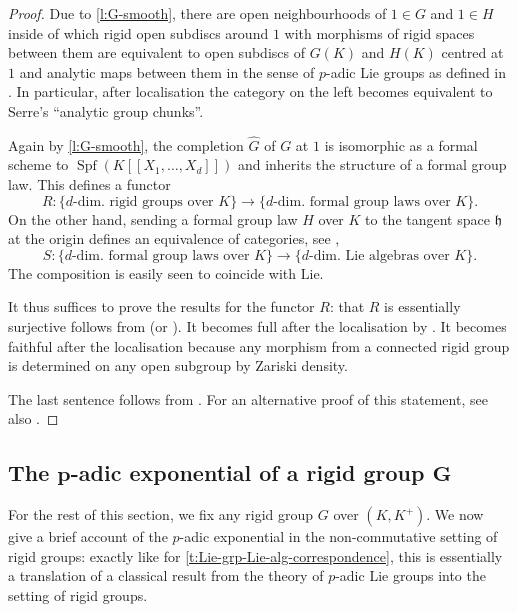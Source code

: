 \documentclass[10pt,a4paper]{article}
\theoremstyle{definition}
\theoremstyle{remark}
\newcommand{\lra}{\longrightarrow}
\newcommand{\wh}{\widehat}
\newcommand{\Spf}{\operatorname{Spf}}
\numberwithin{equation}{section}
\begin{document}
\begin{proof}
	Due to \cref{l:G-smooth}, there are open neighbourhoods of $1\in G$ and $1\in H$ inside of which rigid open subdiscs around $1$ with morphisms of rigid spaces between them are equivalent to open subdiscs of $G(K)$ and $H(K)$ centred at $1$ and analytic maps between them in the sense of $p$-adic Lie groups as defined in \cite[Part~II, Chapter~II]{Serre_Lie}. In particular, after localisation the category on the left becomes  equivalent to Serre's ``analytic group chunks''.
	
	Again by \cref{l:G-smooth}, the completion $\wh G$ of $G$ at $1$ is isomorphic as a formal scheme to $\Spf(K[[X_1,\dots,X_d]])$ and inherits the structure of a formal group law. This defines a functor
	\[R\colon\{\text{$d$-dim.\ rigid groups over $K$}\}\lra \{\text{$d$-dim.\ formal group laws over $K$}\}.\]
	On the other hand, sending a formal group law $H$ over $K$ to the tangent space $\mathfrak h$ at the origin defines an equivalence of categories, see \cite[Part II, Chapter V.6]{Serre_Lie}, 
	\[S\colon\{\text{$d$-dim.\ formal group laws over $K$}\}\lra \{\text{$d$-dim.\ Lie algebras over $K$}\}.\] 
	The composition is easily seen to coincide with $\mathrm{Lie}$. 
	
	It thus suffices to prove the results for the functor $R$: that $R$ is essentially surjective follows from \cite[Part II, Chapter IV.8, Theorem~1]{Serre_Lie} (or \cite[Proposition 17.6]{Schneider_Lie}). It becomes full after the localisation by \cite[Part II, Chapter V.7, Theorem~1]{Serre_Lie}. It becomes faithful after the localisation because any morphism from a connected rigid group is determined on any open subgroup by Zariski density.
	
	The last sentence follows from \cite[Part II, Chapter V.7, Corollary~1.2]{Serre_Lie}.   For an alternative proof of this statement, see also \cite[Section~1, Lemmes 1 et~2]{Fargues-groupes-analytiques}.
\end{proof}


\subsection{The $\boldsymbol{p}$-adic exponential of a rigid group $\boldsymbol{G}$}\label{s:exp-log}
For the rest of this section, we fix any rigid group $G$ over $(K,K^+)$. 
We now give a brief account of the $p$-adic exponential in the non-commutative setting of rigid groups:  exactly like for \cref{t:Lie-grp-Lie-alg-correspondence}, this  is essentially a translation of a classical result from the theory of $p$-adic Lie groups into the setting of rigid groups. 
\end{document}
